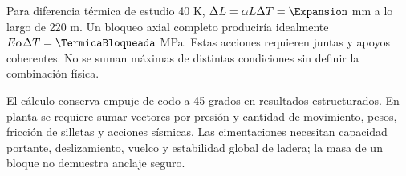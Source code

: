 Para diferencia térmica de estudio 40 K, $\Delta L=\alpha L\Delta T=\Expansion$ mm a lo largo de 220 m. Un bloqueo axial completo produciría idealmente $E\alpha\Delta T=\TermicaBloqueada$ MPa. Estas acciones requieren juntas y apoyos coherentes. No se suman máximas de distintas condiciones sin definir la combinación física.

El cálculo conserva empuje de codo a 45 grados en resultados estructurados. En planta se requiere sumar vectores por presión y cantidad de movimiento, pesos, fricción de silletas y acciones sísmicas. Las cimentaciones necesitan capacidad portante, deslizamiento, vuelco y estabilidad global de ladera; la masa de un bloque no demuestra anclaje seguro.
